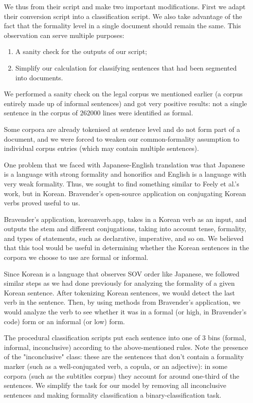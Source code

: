 \documentclass[11pt]{article}
\begin{document}
We thus from their script and make two important modifications. First we adapt their conversion script into a classification script. We also take advantage of the fact that the formality level in a single document should remain the same. This observation can serve multiple purposes:

\begin{enumerate}[label=\arabic*]
    \item A sanity check for the outputs of our script;
    \item Simplify our calculation for classifying sentences that had been segmented into documents.
\end{enumerate}

We performed a sanity check on the legal corpus we mentioned earlier (a corpus entirely made up of informal sentences) and got very positive results: not a single sentence in the corpus of $262000$ lines were identified as formal.

Some corpora are already tokenised at sentence level and do not form part of a document, and we were forced to weaken our common-formality assumption to individual corpus entries (which may contain multiple sentences). 

One problem that we faced with Japanese-English translation was that Japanese is a language with strong formality and honorifics and English is a language with very weak formality. Thus, we sought to find something similar to Feely et al.'s work, but in Korean. Bravender's open-source application on conjugating Korean verbs proved useful to us.

Bravender's application, koreanverb.app, takes in a Korean verb as an input, and outputs the stem and different conjugations, taking into account tense, formality, and types of statements, such as declarative, imperative, and so on. We believed that this tool would be useful in determining whether the Korean sentences in the corpora we choose to use are formal or informal.

Since Korean is a language that observes SOV order like Japanese, we followed similar steps as we had done previously for analyzing the formality of a given Korean sentence. After tokenizing Korean sentences, we would detect the last verb in the sentence. Then, by using methods from Bravender's application, we would analyze the verb to see whether it was in a formal (or high, in Bravender's code) form or an informal (or low) form.

The procedural classification scripts put each sentence into one of $3$ bins (formal, informal, inconclusive) according to the above-mentioned rules. Note the presence of the "inconclusive" class: these are the sentences that don't contain a formality marker (such as a well-conjugated verb, a copula, or an adjective): in some corpora (such as the subtitles corpus) they account for around one-third of the sentences. We simplify the task for our model by removing all inconclusive sentences and making formality classification a binary-classification task. 
\end{document}
